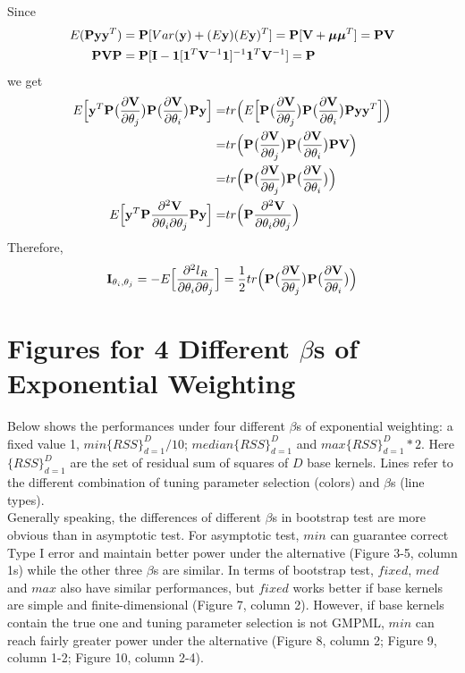\documentclass[11pt]{article}
\begin{document}
Since 
\begin{align*}
E({\bf P} {\bf y} {\bf y}^T)&={\bf P} [Var({\bf y})+(E{\bf y})(E{\bf y})^T]={\bf P} [{\bf V}+\boldsymbol{\mu} \boldsymbol{\mu}^T]={\bf P} {\bf V} \\
{\bf P} {\bf V} {\bf P}&={\bf P}[{\bf I}-\mathbf{1}[\mathbf{1}^T{\bf V}^{-1}\mathbf{1}]^{-1}\mathbf{1}^T{\bf V}^{-1}]={\bf P}
\end{align*}
we get
\begin{align*}
E\Big[{\bf y}^T {\bf P}\big(\frac{\partial {\bf V}}{\partial \theta_j}\big){\bf P} \big(\frac{\partial {\bf V}}{\partial \theta_i}\big){\bf P} {\bf y} \Big]=&tr\Big(E\Big[{\bf P}\big(\frac{\partial {\bf V}}{\partial \theta_j}\big){\bf P} \big(\frac{\partial {\bf V}}{\partial \theta_i}\big){\bf P} {\bf y} {\bf y}^T \Big] \Big)\\
=&tr\Big({\bf P}\big(\frac{\partial {\bf V}}{\partial \theta_j}\big){\bf P} \big(\frac{\partial {\bf V}}{\partial \theta_i}\big){\bf P} {\bf V} \Big)\\
=&tr\Big({\bf P}\big(\frac{\partial {\bf V}}{\partial \theta_j}\big){\bf P} \big(\frac{\partial {\bf V}}{\partial \theta_i}\big)\Big)\\
E\Big[{\bf y}^T {\bf P}\frac{\partial^2 {\bf V}}{\partial \theta_i \partial \theta_j}{\bf P} {\bf y} \Big]=&tr\Big({\bf P}\frac{\partial^2 {\bf V}}{\partial \theta_i \partial \theta_j}\Big)
\end{align*}
Therefore, 
\begin{align*}
{\bf I}_{\theta_i, \theta_j}=-E\Big[\frac{\partial^2 l_R}{\partial \theta_i \partial \theta_j}\Big]=\frac{1}{2}tr\Big({\bf P}\big(\frac{\partial {\bf V}}{\partial \theta_j}\big){\bf P} \big(\frac{\partial {\bf V}}{\partial \theta_i}\big)\Big)
\end{align*}


\section{{\bf Figures for 4 Different $\beta$s of Exponential Weighting}}
Below shows the performances under four different $\beta$s of exponential weighting: a fixed value 1, $min\{RSS\} _{d=1}^D/10$; $median\{RSS\} _{d=1}^D$ and $max\{RSS\} _{d=1}^D * 2$. Here $\{RSS\} _{d=1}^D$ are the set of residual sum of squares of $D$ base kernels. Lines refer to the different combination of tuning parameter selection (colors) and $\beta$s (line types).\\

Generally speaking, the differences of different $\beta$s in bootstrap test are more obvious than in asymptotic test. For asymptotic test, $min$ can guarantee correct Type I error and maintain better power under the alternative (Figure 3-5, column 1s) while the other three $\beta$s are similar. In terms of bootstrap test, $fixed$, $med$ and $max$ also have similar performances, but $fixed$ works better if base kernels are simple and finite-dimensional (Figure 7, column 2). However, if base kernels contain the true one and tuning parameter selection is not GMPML, $min$ can reach fairly greater power under the alternative (Figure 8, column 2; Figure 9, column 1-2; Figure 10, column 2-4).\\
 
\end{document}
